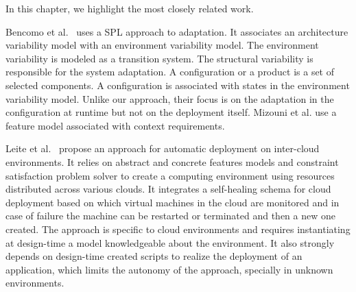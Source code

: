 
In this chapter, we highlight the most closely related work.





Bencomo et al.~\cite{bencomo_dynamically_2008} uses a SPL approach to adaptation. It  associates an architecture variability model with an environment variability model. The environment variability is modeled as a transition system. The structural variability is responsible for the system adaptation. A configuration or a product is a set of selected components. A configuration is associated with states in the environment variability model. Unlike our approach, their focus is on the adaptation in the configuration at runtime but not on the deployment itself. Mizouni et al. \citep{mizouni_framework_2014} use a feature model associated with context requirements.

Leite et al.~\cite{ferreira_leite_user_2014} propose an approach for automatic deployment on inter-cloud environments. It relies on abstract and concrete features models and constraint satisfaction problem solver to create a computing environment using resources distributed across various clouds.
It integrates a self-healing schema for cloud deployment based on which virtual machines in the cloud are monitored and in case of failure the machine can be
restarted or terminated and then a new one created.
The approach is specific to cloud environments and requires instantiating at design-time a model knowledgeable about the environment.
It also strongly depends on design-time created scripts to realize the deployment of an application, which limits the autonomy of the approach, specially in unknown environments.

